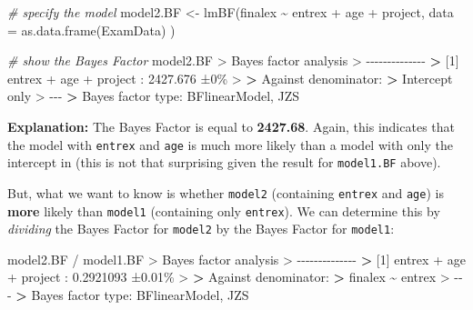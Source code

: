 \documentclass[
]{book}
\newenvironment{Shaded}{\begin{snugshade}}{\end{snugshade}}
\newcommand{\AttributeTok}[1]{\textcolor[rgb]{0.77,0.63,0.00}{#1}}
\newcommand{\CommentTok}[1]{\textcolor[rgb]{0.56,0.35,0.01}{\textit{#1}}}
\newcommand{\DecValTok}[1]{\textcolor[rgb]{0.00,0.00,0.81}{#1}}
\newcommand{\ErrorTok}[1]{\textcolor[rgb]{0.64,0.00,0.00}{\textbf{#1}}}
\newcommand{\FloatTok}[1]{\textcolor[rgb]{0.00,0.00,0.81}{#1}}
\newcommand{\FunctionTok}[1]{\textcolor[rgb]{0.00,0.00,0.00}{#1}}
\newcommand{\NormalTok}[1]{#1}
\newcommand{\OtherTok}[1]{\textcolor[rgb]{0.56,0.35,0.01}{#1}}
\newcommand{\SpecialCharTok}[1]{\textcolor[rgb]{0.00,0.00,0.00}{#1}}
\theoremstyle{definition}
\theoremstyle{definition}
\theoremstyle{definition}
\theoremstyle{definition}
\theoremstyle{remark}
\begin{document}
\begin{Shaded}
\begin{Highlighting}[]
\CommentTok{\# specify the model}
\NormalTok{model2.BF }\OtherTok{\textless{}{-}} \FunctionTok{lmBF}\NormalTok{(finalex }\SpecialCharTok{\textasciitilde{}}\NormalTok{ entrex }\SpecialCharTok{+}\NormalTok{ age }\SpecialCharTok{+}\NormalTok{ project, }\AttributeTok{data =} \FunctionTok{as.data.frame}\NormalTok{(ExamData) )}

\CommentTok{\# show the Bayes Factor}
\NormalTok{model2.BF}
\SpecialCharTok{\textgreater{}}\NormalTok{ Bayes factor analysis}
\SpecialCharTok{\textgreater{}} \SpecialCharTok{{-}{-}{-}{-}{-}{-}{-}{-}{-}{-}{-}{-}{-}{-}}
\ErrorTok{\textgreater{}}\NormalTok{ [}\DecValTok{1}\NormalTok{] entrex }\SpecialCharTok{+}\NormalTok{ age }\SpecialCharTok{+}\NormalTok{ project }\SpecialCharTok{:} \FloatTok{2427.676}\NormalTok{ ±}\DecValTok{0}\NormalTok{\%}
\SpecialCharTok{\textgreater{}} 
\ErrorTok{\textgreater{}}\NormalTok{ Against denominator}\SpecialCharTok{:}
\ErrorTok{\textgreater{}}\NormalTok{   Intercept only }
\SpecialCharTok{\textgreater{}} \SpecialCharTok{{-}{-}{-}}
\ErrorTok{\textgreater{}}\NormalTok{ Bayes factor type}\SpecialCharTok{:}\NormalTok{ BFlinearModel, JZS}
\end{Highlighting}
\end{Shaded}

\hfill\break

\textbf{Explanation:} The Bayes Factor is equal to \textbf{2427.68}. Again, this indicates that the model with \texttt{entrex} and \texttt{age} is much more likely than a model with only the intercept in (this is not that surprising given the result for \texttt{model1.BF} above).

But, what we want to know is whether \texttt{model2} (containing \texttt{entrex} and \texttt{age}) is \textbf{more} likely than \texttt{model1} (containing only \texttt{entrex}). We can determine this by \emph{dividing} the Bayes Factor for \texttt{model2} by the Bayes Factor for \texttt{model1}:

\begin{Shaded}
\begin{Highlighting}[]
\NormalTok{model2.BF }\SpecialCharTok{/}\NormalTok{ model1.BF}
\SpecialCharTok{\textgreater{}}\NormalTok{ Bayes factor analysis}
\SpecialCharTok{\textgreater{}} \SpecialCharTok{{-}{-}{-}{-}{-}{-}{-}{-}{-}{-}{-}{-}{-}{-}}
\ErrorTok{\textgreater{}}\NormalTok{ [}\DecValTok{1}\NormalTok{] entrex }\SpecialCharTok{+}\NormalTok{ age }\SpecialCharTok{+}\NormalTok{ project }\SpecialCharTok{:} \FloatTok{0.2921093}\NormalTok{ ±}\FloatTok{0.01}\NormalTok{\%}
\SpecialCharTok{\textgreater{}} 
\ErrorTok{\textgreater{}}\NormalTok{ Against denominator}\SpecialCharTok{:}
\ErrorTok{\textgreater{}}\NormalTok{   finalex }\SpecialCharTok{\textasciitilde{}}\NormalTok{ entrex }
\SpecialCharTok{\textgreater{}} \SpecialCharTok{{-}{-}{-}}
\ErrorTok{\textgreater{}}\NormalTok{ Bayes factor type}\SpecialCharTok{:}\NormalTok{ BFlinearModel, JZS}
\end{Highlighting}
\end{Shaded}
\end{document}
